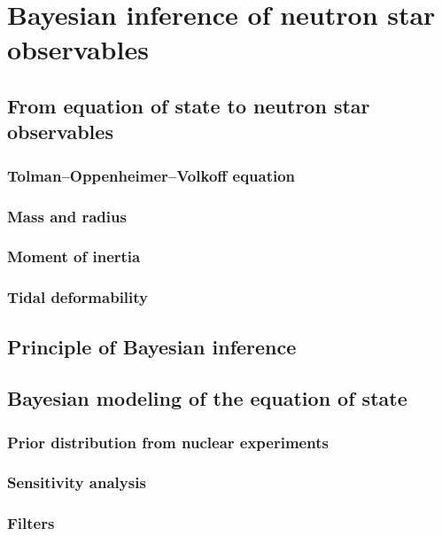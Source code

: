 \chapter{Bayesian inference of neutron star observables}

\section{From equation of state to neutron star observables}

\subsection{Tolman–Oppenheimer–Volkoff equation}

\subsection{Mass and radius}

\subsection{Moment of inertia}

\subsection{Tidal deformability}

\section{Principle of Bayesian inference}

\section{Bayesian modeling of the equation of state}

\subsection{Prior distribution from nuclear experiments}

\subsection{Sensitivity analysis}

\subsection{Filters}

